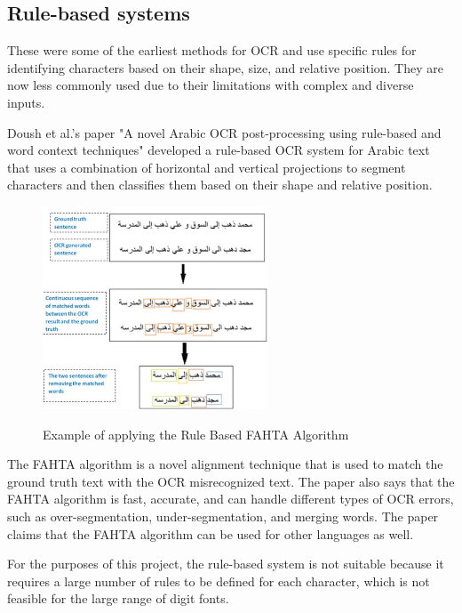 \newpage

\subsection{Rule-based systems}

These were some of the earliest methods for OCR and use specific rules for identifying characters based on their shape, size, and relative position. They are now less commonly used due to their limitations with complex and diverse inputs.

Doush et al.'s paper "A novel Arabic OCR post-processing using rule-based and word context techniques" developed a rule-based OCR system for Arabic text that uses a combination of horizontal and vertical projections to segment characters and then classifies them based on their shape and relative position. \cite{doushNovelArabicOCR2018}



\begin{figure}[ht]
    \centering
    \includegraphics[width=0.6\textwidth]{Figures/RB_Doush.jpg}
    \caption[Example of applying the Rule Based FAHTA Algorithm]{Example of applying the Rule Based FAHTA Algorithm}\cite{doushNovelArabicOCR2018}
    \label{fig:Doush Rule Based OCR Paper}
\end{figure}

The FAHTA algorithm is a novel alignment technique that is used to match the ground truth text with the OCR misrecognized text. The paper also says that the FAHTA algorithm is fast, accurate, and can handle different types of OCR errors, such as over-segmentation, under-segmentation, and merging words. The paper claims that the FAHTA algorithm can be used for other languages as well.


For the purposes of this project, the rule-based system is not suitable because it requires a large number of rules to be defined for each character, which is not feasible for the large range of digit fonts.


